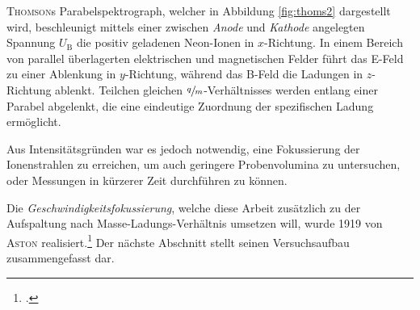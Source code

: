 
\textsc{Thomson}s Parabelspektrograph, welcher in Abbildung \ref{fig:thoms2} dargestellt wird, beschleunigt mittels einer zwischen \textit{Anode} und \textit{Kathode} angelegten Spannung $U_\mathrm{B}$ die positiv geladenen Neon-Ionen in $x$-Richtung. In einem Bereich von parallel überlagerten elektrischen und magnetischen Felder führt das E-Feld zu einer Ablenkung in $y$-Richtung, während das B-Feld die Ladungen in $z$-Richtung ablenkt. Teilchen gleichen $\sfrac{q}{m}$-Verhältnisses werden entlang einer Parabel abgelenkt, die eine eindeutige Zuordnung der spezifischen Ladung ermöglicht.\par
Aus Intensitätsgründen war es jedoch notwendig, eine Fokussierung der Ionenstrahlen zu erreichen, um auch geringere Probenvolumina zu untersuchen, oder Messungen in kürzerer Zeit durchführen zu können.\par
Die \textit{Geschwindigkeitsfokussierung}, welche diese Arbeit zusätzlich zu der Aufspaltung nach Masse-Ladungs-Verhältnis umsetzen will, wurde 1919 von \textsc{Aston} realisiert.\footcite[vgl.][S.\,51]{Demtroeder2010} Der nächste Abschnitt stellt seinen Versuchsaufbau zusammengefasst dar.



